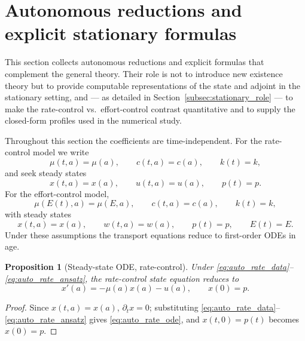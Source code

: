 \documentclass[pdflatex,sn-mathphys-num]{sn-jnl}
\newtheorem{proposition}[theorem]{Proposition}
\theoremstyle{definition}
\theoremstyle{remark}
\begin{document}
\section{Autonomous reductions and explicit stationary formulas}
\label{sec:autonomous}

This section collects autonomous reductions and explicit formulas that
complement the general theory. Their role is not to introduce new existence
theory but to provide computable representations of the state and adjoint in
the stationary setting, and --- as detailed in
Section~\ref{subsec:stationary_role} --- to make the rate-control vs.\
effort-control contrast quantitative and to supply the closed-form profiles
used in the numerical study.

Throughout this section the coefficients are time-independent. For the
rate-control model we write
\begin{equation}\label{eq:auto_rate_data}
\mu(t,a)=\mu(a),\qquad c(t,a)=c(a),\qquad k(t)=k,
\end{equation}
and seek steady states
\begin{equation}\label{eq:auto_rate_ansatz}
x(t,a)=x(a),\qquad u(t,a)=u(a),\qquad p(t)=p.
\end{equation}
For the effort-control model,
\begin{equation}\label{eq:auto_effort_data}
\mu(E(t),a)=\mu(E,a),\qquad c(t,a)=c(a),\qquad k(t)=k,
\end{equation}
with steady states
\begin{equation}\label{eq:auto_effort_ansatz}
x(t,a)=x(a),\qquad w(t,a)=w(a),\qquad p(t)=p,\qquad E(t)=E.
\end{equation}
Under these assumptions the transport equations reduce to first-order ODEs in
age.

\begin{proposition}[Steady-state ODE, rate-control]
\label{prop:auto_rate_ode}
Under \eqref{eq:auto_rate_data}--\eqref{eq:auto_rate_ansatz}, the
rate-control state equation reduces to
\begin{equation}\label{eq:auto_rate_ode}
x'(a)=-\mu(a)x(a)-u(a),\qquad x(0)=p.
\end{equation}
\end{proposition}
\begin{proof}
Since $x(t,a)=x(a)$, $\partial_t x=0$; substituting
\eqref{eq:auto_rate_data}--\eqref{eq:auto_rate_ansatz} gives
\eqref{eq:auto_rate_ode}, and $x(t,0)=p(t)$ becomes $x(0)=p$.
\end{proof}
\end{document}
